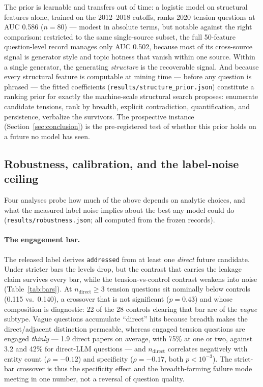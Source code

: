 \documentclass[11pt]{article}
\begin{document}
The prior is learnable and transfers out of time: a logistic model on
structural features alone, trained on the 2012--2018 cutoffs, ranks
2020 tension questions at AUC 0.586 ($n=80$) --- modest in absolute
terms, but notable against the right comparison: restricted to the same
single-source subset, the full 50-feature question-level record manages
only AUC 0.502, because most of its cross-source signal is generator
style and topic hotness that vanish within one source. Within a single
generator, the generating \emph{structure} is the recoverable signal.
And because every structural feature is computable at mining time ---
before any question is phrased --- the fitted coefficients
(\texttt{results/structure\_prior.json}) constitute a ranking prior for
exactly the machine-scale structural search \cite{paper2} proposes:
enumerate candidate tensions, rank by breadth, explicit contradiction,
quantification, and persistence, verbalize the survivors. The
prospective instance (Section~\ref{sec:conclusion}) is the pre-registered test of whether
this prior holds on a future no model has seen.

\subsection{Robustness, calibration, and the label-noise ceiling}
\label{sec:robustness}

Four analyses probe how much of the above depends on analytic choices, and
what the measured label noise implies about the best any model could do
(\texttt{results/robustness.json}; all computed from the frozen records).

\paragraph{The engagement bar.} The released label derives
\texttt{addressed} from at least one \emph{direct} future candidate. Under
stricter bars the levels drop, but the contrast that carries the leakage
claim survives every bar, while the tension-vs-control contrast weakens
into noise (Table~\ref{tab:bars}). At $n_\mathrm{direct}\geq 3$ tension
questions sit nominally below controls (0.115 vs.\ 0.140), a crossover
that is not significant ($p=0.43$) and whose composition is diagnostic:
22 of the 28 controls clearing that bar are of the \emph{vague} subtype.
Vague questions accumulate ``direct'' hits because breadth makes the
direct/adjacent distinction permeable, whereas engaged tension questions
are engaged \emph{thinly} --- 1.9 direct papers on average, with 75\% at
one or two, against 3.2 and 42\% for direct-LLM questions --- and
$n_\mathrm{direct}$ correlates negatively with entity count
($\rho=-0.12$) and specificity ($\rho=-0.17$, both $p<10^{-3}$). The
strict-bar crossover is thus the specificity effect and the
breadth-farming failure mode meeting in one number, not a reversal of
question quality.
\end{document}
